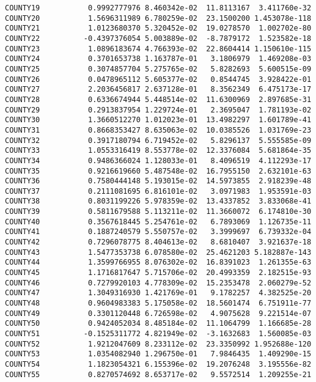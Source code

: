 \documentclass[
  letterpaper,
  DIV=11,
  numbers=noendperiod]{scrartcl}
\begin{document}
\begin{verbatim}
COUNTY19           0.9992777976 8.460342e-02  11.8113167  3.411760e-32
COUNTY20           1.5696311989 6.780259e-02  23.1500200 1.453078e-118
COUNTY21           1.0123680370 5.320452e-02  19.0278570  1.002702e-80
COUNTY22          -0.4397376054 5.003889e-02  -8.7879172  1.523582e-18
COUNTY23           1.0896183674 4.766393e-02  22.8604414 1.150610e-115
COUNTY24           0.3701653738 1.163787e-01   3.1806979  1.469208e-03
COUNTY25           0.3074857704 5.275765e-02   5.8282693  5.600515e-09
COUNTY26           0.0478965112 5.605377e-02   0.8544745  3.928422e-01
COUNTY27           2.2036456817 2.637128e-01   8.3562349  6.475173e-17
COUNTY28           0.6336674944 5.448514e-02  11.6300969  2.897685e-31
COUNTY29           0.2913837954 1.229724e-01   2.3695047  1.781193e-02
COUNTY30           1.3660512270 1.012023e-01  13.4982297  1.601789e-41
COUNTY31           0.8668353427 8.635063e-02  10.0385526  1.031769e-23
COUNTY32           0.3917180794 6.719452e-02   5.8296137  5.555585e-09
COUNTY33           1.0553316419 8.553778e-02  12.3376084  5.681864e-35
COUNTY34           0.9486366024 1.128033e-01   8.4096519  4.112293e-17
COUNTY35           0.9216619660 5.487548e-02  16.7955150  2.632101e-63
COUNTY36           0.7580444148 5.193015e-02  14.5973855  2.918239e-48
COUNTY37           0.2111081695 6.816101e-02   3.0971983  1.953591e-03
COUNTY38           0.8031199226 5.978359e-02  13.4337852  3.833068e-41
COUNTY39           0.5811679588 5.113211e-02  11.3660072  6.174810e-30
COUNTY40           0.3567618445 5.254761e-02   6.7893069  1.126735e-11
COUNTY41           0.1887240579 5.550757e-02   3.3999697  6.739332e-04
COUNTY42           0.7296078775 8.404613e-02   8.6810407  3.921637e-18
COUNTY43           1.5477353738 6.078580e-02  25.4621203 5.182887e-143
COUNTY44           1.3599766955 8.076302e-02  16.8391023  1.261355e-63
COUNTY45           1.1716817647 5.715706e-02  20.4993359  2.182515e-93
COUNTY46           0.7279920103 4.778309e-02  15.2353478  2.060279e-52
COUNTY47           1.3049316930 1.421769e-01   9.1782257  4.382525e-20
COUNTY48           0.9604983383 5.175058e-02  18.5601474  6.751911e-77
COUNTY49           0.3301120448 6.726598e-02   4.9075628  9.221514e-07
COUNTY50           0.9424052034 8.485184e-02  11.1064799  1.166685e-28
COUNTY51          -0.1525311772 4.821949e-02  -3.1632683  1.560085e-03
COUNTY52           1.9212047609 8.233112e-02  23.3350992 1.952688e-120
COUNTY53           1.0354082940 1.296750e-01   7.9846435  1.409290e-15
COUNTY54           1.1823054321 6.155396e-02  19.2076248  3.195556e-82
COUNTY55           0.8270574692 8.653717e-02   9.5572514  1.209255e-21

\end{verbatim}
\end{document}
